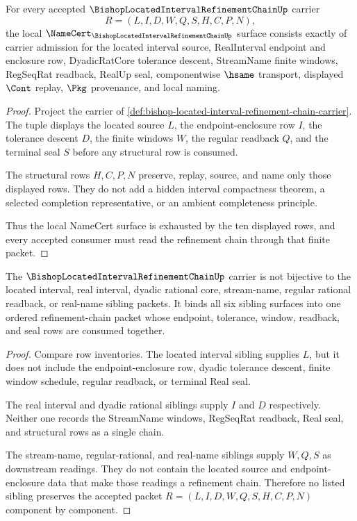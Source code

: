 \begin{theorem}
\label{thm:bishop-located-interval-refinement-chain-namecert-obligations}
For every accepted $\BishopLocatedIntervalRefinementChainUp$ carrier
$$
R=(L,I,D,W,Q,S,H,C,P,N),
$$
the local $\NameCert_{\BishopLocatedIntervalRefinementChainUp}$ surface consists exactly of carrier admission for the located interval source, RealInterval endpoint and enclosure row, DyadicRatCore tolerance descent, StreamName finite windows, RegSeqRat readback, RealUp seal, componentwise $\hsame$ transport, displayed $\Cont$ replay, $\Pkg$ provenance, and local naming.
\end{theorem}
\begin{proof}
Project the carrier of \autoref{def:bishop-located-interval-refinement-chain-carrier}. The tuple displays the located source $L$, the endpoint-enclosure row $I$, the tolerance descent $D$, the finite windows $W$, the regular readback $Q$, and the terminal seal $S$ before any structural row is consumed.

The structural rows $H,C,P,N$ preserve, replay, source, and name only those displayed rows. They do not add a hidden interval compactness theorem, a selected completion representative, or an ambient completeness principle.

Thus the local NameCert surface is exhausted by the ten displayed rows, and every accepted consumer must read the refinement chain through that finite packet.
\end{proof}

\begin{theorem}
\label{thm:bishop-located-interval-refinement-chain-sibling-route}
The $\BishopLocatedIntervalRefinementChainUp$ carrier is not bijective to the located interval, real interval, dyadic rational core, stream-name, regular rational readback, or real-name sibling packets. It binds all six sibling surfaces into one ordered refinement-chain packet whose endpoint, tolerance, window, readback, and seal rows are consumed together.
\end{theorem}
\begin{proof}
Compare row inventories. The located interval sibling supplies $L$, but it does not include the endpoint-enclosure row, dyadic tolerance descent, finite window schedule, regular readback, or terminal Real seal.

The real interval and dyadic rational siblings supply $I$ and $D$ respectively. Neither one records the StreamName windows, RegSeqRat readback, Real seal, and structural rows as a single chain.

The stream-name, regular-rational, and real-name siblings supply $W,Q,S$ as downstream readings. They do not contain the located source and endpoint-enclosure data that make those readings a refinement chain. Therefore no listed sibling preserves the accepted packet $R=(L,I,D,W,Q,S,H,C,P,N)$ component by component.
\end{proof}

